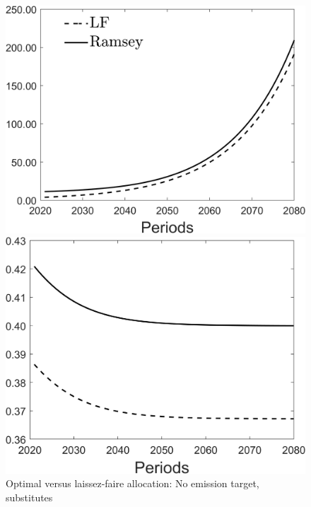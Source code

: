 \begin{figure}[h!!]
	\centering
	\caption{Optimal versus laissez-faire allocation: No emission target, substitutes }\label{fig:optallo_subs}
	\begin{minipage}[]{0.32\textwidth}
		\includegraphics[width=1\textwidth]{../../codding_model/Own/figures/Rep_agent/staticRam_LF_separate_c_periods59_eppsilon4.00_zeta1.40_Ad08_Ac04_thetac0.70_thetad0.56_HetGrowth1_tauul0.181_util0_withtarget0_lgd1.png}
	\end{minipage}
	\begin{minipage}[]{0.32\textwidth}
		\includegraphics[width=1\textwidth]{../../codding_model/Own/figures/Rep_agent/staticRam_LF_separate_hh_periods59_eppsilon4.00_zeta1.40_Ad08_Ac04_thetac0.70_thetad0.56_HetGrowth1_tauul0.181_util0_withtarget0_lgd0.png}

\end{minipage}
\end{figure}
